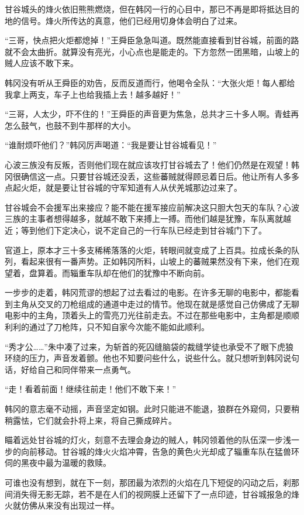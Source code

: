 甘谷城头的烽火依旧熊熊燃烧，但在韩冈一行的心目中，那已不再是即将抵达目的地的信号。烽火所传达的真意，他们已经用切身体会明白了过来。

“三哥，快点把火炬都熄掉！”王舜臣急急叫道。既然能直接看到甘谷城，前面的路就不会太曲折。就算没有亮光，小心点也是能走的。下方忽然一团黑暗，山坡上的贼人应该不敢下来。

韩冈没有听从王舜臣的劝告，反而反道而行，他喝令全队：“大张火炬！每人都给我拿上两支，车子上也给我插上去！越多越好！”

“三哥，人太少，吓不住的！”王舜臣的声音更为焦急，总共才三十多人啊。青蛙再怎么鼓气，也鼓不到牛那样的大小。

“谁耐烦吓他们？”韩冈厉声喝道：“我是要让甘谷城看见！”

心波三族没有反叛，否则他们现在就应该攻打甘谷城去了！他们仍然是在观望！韩冈很确信这一点。只要甘谷城还没丢，这些蕃贼就得顾忌着日后。他让所有人多多点起火炬，就是要让甘谷城的守军知道有人从伏羌城那边过来了。

甘谷城会不会援军出来接应？能不能在援军接应前解决这只胆大包天的车队？心波三族的主事者想得越多，就越不敢下来搏上一搏。而他们越是犹豫，车队离就越近；等到他们下定决心，说不定自己的一行车队已经走到甘谷城门下了。

官道上，原本才三十多支稀稀落落的火炬，转眼间就变成了上百具。拉成长条的队列，看起来很有一番声势。正如韩冈所料，山坡上的蕃贼果然没有下来，他们在观望着，盘算着。而辎重车队却在他们的犹豫中不断向前。

一步步的走着，韩冈荒谬的想起了过去看过的电影。在许多无聊的电影中，都能看到主角从交叉的刀枪组成的通道中走过的情节。他现在就是感觉自己仿佛成了无聊电影中的主角，顶着头上的雪亮刀光往前走去。不过在那些电影中，主角都是顺顺利利的通过了刀枪阵，只不知自家今次能不能如此顺利。

“秀才公……”朱中凑了过来，为斩首的死囚缝脑袋的裁缝学徒也承受不了眼下虎狼环绕的压力，声音发着颤。他也不知要问些什么，说些什么。就只想听到韩冈说句话，好给自己和同伴带来一点勇气。

“走！看着前面！继续往前走！他们不敢下来！”

韩冈的意志毫不动摇，声音坚定如钢。此时只能进不能退，狼群在外窥伺，只要稍稍露怯，它们就会扑将上来，将自己撕成碎片。

瞄着远处甘谷城的灯火，刻意不去理会身边的贼人，韩冈领着他的队伍深一步浅一步的向前移动。甘谷城的烽火火焰冲霄，告急的黄色火光却成了辎重车队在猛兽环伺的黑夜中最为温暖的救赎。

可谁也没有想到，就在下一刻，那团最为浓烈的火焰在几下短促的闪动之后，刹那间消失得无影无踪，若不是在人们的视网膜上还留下了一点印迹，甘谷城报急的烽火就仿佛从来没有出现过一样。

